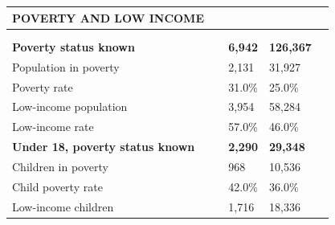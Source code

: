 \documentclass[9pt]{report}
\begin{document}
\vspace{12pt}
\setlength{\tabcolsep}{.01in} %
\begin{tabular}{p{.10in}p{.10in}p{.10in}p{3.7in}>{\hfill}p{.85in}>{\hfill}p{.85in}>{\hfill}p{.85in}>{\hfill}p{.85in}p{0.1in}}
\multicolumn{9}{l}{\parbox{7.1in}{\raggedright{\large{\strut\textbf{POVERTY AND LOW INCOME}\strut}}}} \\ 
\hline
\multicolumn{4}{l}{\parbox{3.5in}{\raggedright{\textbf{}}}} & \multicolumn{1}{r}{\parbox{.85in}{\strut\raggedleft{\textbf{}\strut}}} & \multicolumn{1}{r}{\parbox{.85in}{\strut\raggedleft{\textbf{}\strut}}} & \multicolumn{1}{r}{\parbox{.85in}{\strut{}}} & \multicolumn{1}{r}{\parbox{.85in}{\strut{}}} & \\ 
\multicolumn{9}{l}{} \\ 
\multicolumn{4}{l}{\parbox{3.5in}{\strut\raggedright{\textbf{Poverty status known}\strut}}} & \textbf{} & \textbf{} & \textbf{6,942} & \textbf{126,367} & \textbf{} \\ 
\multicolumn{4}{l}{\parbox{3.6in}{\strut\raggedright{{Population in poverty}}\strut}} &  &  & 2,131 & 31,927 & \multicolumn{1}{l}{}  \\ 
\multicolumn{4}{l}{\parbox{3.6in}{\strut\raggedright{{Poverty rate}}\strut}} &  &  & 31.0\% & 25.0\% & \multicolumn{1}{l}{}  \\ 
\multicolumn{4}{l}{\parbox{3.6in}{\strut\raggedright{{Low-income population}}\strut}} &  &  & 3,954 & 58,284 & \multicolumn{1}{l}{}  \\ 
\multicolumn{4}{l}{\parbox{3.6in}{\strut\raggedright{{Low-income rate}}\strut}} &  &  & 57.0\% & 46.0\% & \multicolumn{1}{l}{}  \\ 
\multicolumn{4}{l}{\parbox{3.5in}{\strut\raggedright{\textbf{Under 18, poverty status known}\strut}}} & \textbf{} & \textbf{} & \textbf{2,290} & \textbf{29,348} & \textbf{} \\ 
\multicolumn{4}{l}{\parbox{3.6in}{\strut\raggedright{{Children in poverty}}\strut}} &  &  & 968 & 10,536 & \multicolumn{1}{l}{}  \\ 
\multicolumn{4}{l}{\parbox{3.6in}{\strut\raggedright{{Child poverty rate}}\strut}} &  &  & 42.0\% & 36.0\% & \multicolumn{1}{l}{}  \\ 
\multicolumn{4}{l}{\parbox{3.6in}{\strut\raggedright{{Low-income children}}\strut}} &  &  & 1,716 & 18,336 & \multicolumn{1}{l}{}  \\ 

\end{tabular}
\end{document}
